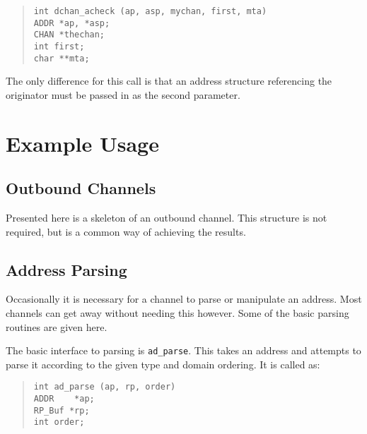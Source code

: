 \begin{quote}\small\begin{verbatim}
int dchan_acheck (ap, asp, mychan, first, mta)
ADDR *ap, *asp;
CHAN *thechan;
int first;
char **mta;
\end{verbatim}\end{quote}

The only difference for this call is that an address structure
referencing the originator must be passed in as the second parameter.

\section {Example Usage}

\subsection {Outbound Channels}

Presented here is a skeleton of an outbound channel. This structure is
not required, but is a common way of achieving the results.


\subsection{Address Parsing}

Occasionally it is necessary for a channel to parse or manipulate an
address. Most channels can get away without needing this however.
Some of the basic parsing routines are given here.

The basic interface to parsing is \verb|ad_parse|. This takes an
address and attempts to parse it according to the given type and
domain ordering. It is called as:

\begin{quote}\begin{verbatim}
int ad_parse (ap, rp, order)
ADDR	*ap;
RP_Buf *rp;
int order;
\end{verbatim}\end{quote}

